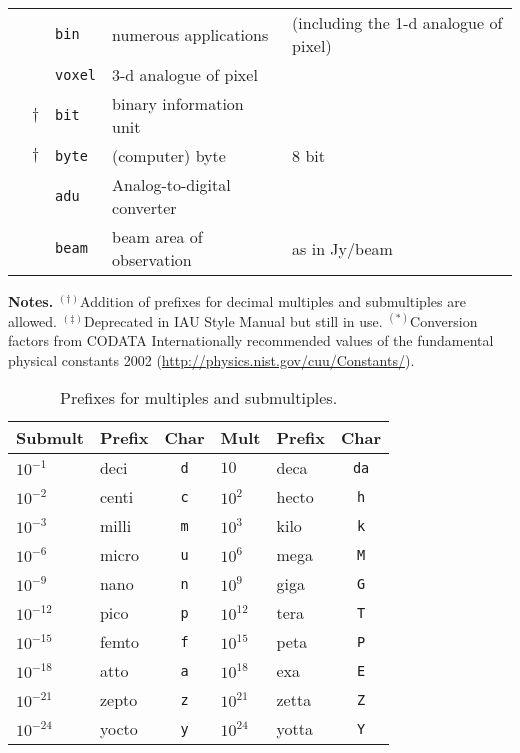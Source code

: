 \documentclass[onecolumn]{aa}
\begin{document}
\begin{table*}
\begin{center}
\begin{tabular}{lclll}
               &      & \verb+bin+   & numerous applications 
                      &  (including the 1-d analogue of pixel) \\
               &      & \verb+voxel+ & 3-d analogue of pixel & \\
               &$\dag$& \verb+bit+   & binary information unit & \\
               &$\dag$& \verb+byte+  & (computer) byte & 8 bit \\
               &      & \verb+adu+   & Analog-to-digital converter & \\
               &      & \verb+beam+  & beam area of observation & 
                                       as in Jy/beam\\ 
\hline 
\end{tabular}
\end{center}
{\bf Notes.} $^{(\dag)}$Addition of prefixes for decimal multiples and submultiples are allowed.
$^{(\ddag)}$Deprecated  in IAU Style Manual \citep{mcnally88} but still in use. 
$^{(*)}$Conversion factors from CODATA Internationally recommended values of the 
fundamental physical constants 2002 (\url{http://physics.nist.gov/cuu/Constants/}).
\vspace{10pt}
\label{ta:extunit}
\end{table*}

\begin{table}
\centering
\caption{Prefixes for multiples and submultiples.}
\label{ta:mulunit}
\begin{tabular}{llcllc}
\hline \hline
Submult & Prefix & Char & Mult & Prefix & Char \\
%
\hline
$10^{-1}$  & deci  & \verb+d+ &$10$      & deca  & \verb+da+ \\
$10^{-2}$  & centi & \verb+c+ &$10^{2}$  & hecto & \verb+h+  \\
$10^{-3}$  & milli & \verb+m+ &$10^{3}$  & kilo  & \verb+k+  \\
$10^{-6}$  & micro & \verb+u+ &$10^{6}$  & mega  & \verb+M+  \\
$10^{-9}$  & nano  & \verb+n+ &$10^{9}$  & giga  & \verb+G+  \\
$10^{-12}$ & pico  & \verb+p+ &$10^{12}$ & tera  & \verb+T+  \\
$10^{-15}$ & femto & \verb+f+ &$10^{15}$ & peta  & \verb+P+  \\
$10^{-18}$ & atto  & \verb+a+ &$10^{18}$ & exa   & \verb+E+  \\
$10^{-21}$ & zepto & \verb+z+ &$10^{21}$ & zetta & \verb+Z+  \\
$10^{-24}$ & yocto & \verb+y+ &$10^{24}$ & yotta & \verb+Y+  \\
\hline
\end{tabular}
\end{table}
\end{document}
